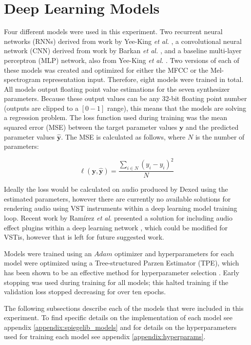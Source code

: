 \section{Deep Learning Models}
Four different models were used in this experiment. Two recurrent neural networks (RNNs) derived from work by Yee-King \textit{et al.} \cite{yee2018automatic}, a convolutional neural network (CNN) derived from work by Barkan \textit{et al.} \cite{barkan2019inversynth}, and a baseline multi-layer perceptron (MLP) network, also from Yee-King \textit{et al.} \cite{yee2018automatic}. Two versions of each of these models was created and optimized for either the MFCC or the Mel-spectrogram representation input. Therefore, eight models were trained in total. All models output floating point value estimations for the seven synthesizer parameters. Because these output values can be any 32-bit floating point number (outputs are clipped to a $[0-1]$ range), this means that the models are solving a regression problem. The loss function used during training was the mean squared error (MSE) between the target parameter values $\textbf{y}$ and the predicted parameter values $\hat{\textbf{y}}$. The MSE is calculated as follows, where $N$ is the number of parameters:

\begin{equation}\label{equation:mse}
    \ell(\textbf{y}, \hat{\textbf{y}}) = \frac{\sum_{i \in N}{(y_i - \hat{y_i})^2}}{N}
\end{equation}

Ideally the loss would be calculated on audio produced by Dexed using the estimated parameters, however there are currently no available solutions for rendering audio using VST instruments within a deep learning model training loop. Recent work by Ramírez \textit{et al.} presented a solution for including audio effect plugins within a deep learning network \cite{ramirez2021differentiable}, which could be modified for VSTis, however that is left for future suggested work. 

Models were trained using an $Adam$ optimizer \cite{kingma2014adam} and hyperparameters for each model were optimized using a Tree-structured Parzen Estimator (TPE), which has been shown to be an effective method for hyperparameter selection \cite{bergstra2011algorithms}. Early stopping was used during training for all models; this halted training if the validation loss stopped decreasing for over ten epochs.

The following subsections describe each of the models that were included in this experiment. To find specific details on the implementation of each model see appendix \ref{appendix:spiegelib_models} and for details on the hyperparameters used for training each model see appendix \ref{appendix:hyperparams}.

